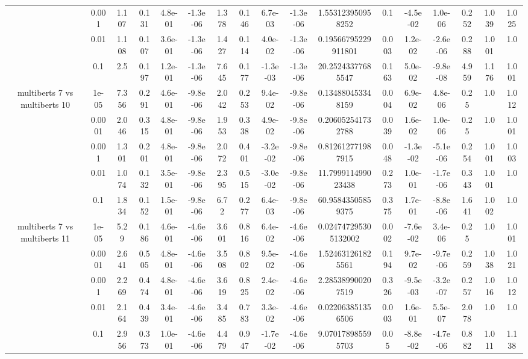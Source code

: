 \begin{tabular}{|c|c|c|c|c|c|c|c|c|c|c|c|c|c|c|c|c|}
 & 0.001 & 1.107 & 0.131 & 4.8e-01 & -1.3e-06 & 1.378 & 0.146 & 6.7e-03 & -1.3e-06 & 1.553123950958252 & 0.1 & -4.5e-02 & 1.0e-06 & 0.252 & 1.039 & 1.025 \\
 & 0.01 & 1.108 & 0.107 & 3.6e-01 & -1.3e-06 & 1.427 & 0.114 & 4.0e-02 & -1.3e-06 & 0.19566795229911801 & 0.003 & 1.2e-02 & -2.6e-06 & 0.288 & 1.001 & 1.0 \\
 & 0.1 & 2.5 & 0.197 & 1.2e-01 & -1.3e-06 & 7.645 & 0.177 & -1.3e-03 & -1.3e-06 & 20.25243377685547 & 0.163 & 5.0e-02 & -9.8e-08 & 4.959 & 1.176 & 1.001 \\
\hline
\multirow{5}{*}{multiberts 7 vs multiberts 10} & 1e-05 & 7.356 & 0.291 & 4.6e-01 & -9.8e-06 & 2.042 & 0.253 & 9.4e-02 & -9.8e-06 & 0.134880453348159 & 0.004 & 6.9e-02 & 4.8e-06 & 0.25 & 1.0 & 1.012 \\
 & 0.0001 & 2.046 & 0.315 & 4.8e-01 & -9.8e-06 & 1.953 & 0.338 & 4.9e-02 & -9.8e-06 & 0.206052541732788 & 0.039 & 1.6e-02 & 1.0e-06 & 0.25 & 1.0 & 1.001 \\
 & 0.001 & 1.301 & 0.201 & 4.8e-01 & -9.8e-06 & 2.072 & 0.401 & -3.2e-02 & -9.8e-06 & 0.812612771987915 & 0.048 & -1.3e-02 & -5.1e-06 & 0.254 & 1.001 & 1.003 \\
 & 0.01 & 1.074 & 0.132 & 3.5e-01 & -9.8e-06 & 2.395 & 0.515 & -3.0e-02 & -9.8e-06 & 11.799911499023438 & 0.273 & 1.0e-01 & -1.7e-06 & 0.343 & 1.001 & 1.0 \\
 & 0.1 & 1.834 & 0.152 & 1.5e-01 & -9.8e-06 & 6.72 & 0.277 & 6.4e-03 & -9.8e-06 & 60.95843505859375 & 0.375 & 1.7e-01 & -8.8e-06 & 1.641 & 1.002 & 1.0 \\
\hline
\multirow{5}{*}{multiberts 7 vs multiberts 11} & 1e-05 & 5.29 & 0.186 & 4.6e-01 & -4.6e-06 & 3.601 & 0.816 & 6.4e-02 & -4.6e-06 & 0.024747295305132002 & 0.002 & -7.6e-02 & 3.4e-06 & 0.25 & 1.0 & 1.001 \\
 & 0.0001 & 2.641 & 0.505 & 4.8e-01 & -4.6e-06 & 3.508 & 0.802 & 9.5e-02 & -4.6e-06 & 1.524631261825561 & 0.194 & 9.7e-02 & -9.7e-06 & 0.259 & 1.038 & 1.021 \\
 & 0.001 & 2.269 & 0.474 & 4.8e-01 & -4.6e-06 & 3.619 & 0.825 & 2.4e-02 & -4.6e-06 & 2.285389900207519 & 0.326 & -9.5e-03 & -3.2e-07 & 0.257 & 1.016 & 1.012 \\
 & 0.01 & 2.164 & 0.439 & 3.4e-01 & -4.6e-06 & 3.485 & 0.783 & 3.3e-02 & -4.6e-06 & 0.022063851356506 & 0.003 & 1.6e-01 & 5.5e-07 & 2.078 & 1.0 & 1.0 \\
 & 0.1 & 2.956 & 0.373 & 1.0e-01 & -4.6e-06 & 4.479 & 0.947 & -1.7e-02 & -4.6e-06 & 9.070178985595703 & 0.05 & -8.8e-02 & -4.7e-06 & 0.882 & 1.011 & 1.138 \\

\end{tabular}
